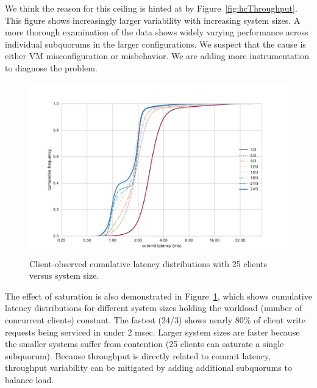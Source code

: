\documentclass[letterpaper,10pt,twocolumn]{article}
\newcommand{\sub}{subquorum\xspace}
\newcommand{\subs}{subquorums\xspace}
\begin{document}
We think the reason for this ceiling is hinted at by
Figure~\ref{fig:hcThroughput}.
This figure shows increasingly larger variability with increasing system
sizes.
A more thorough examination of the data shows widely varying performance
across individual \subs in the larger configurations.
We suspect that the cause is either VM misconfiguration or misbehavior.
We are adding more instrumentation to diagnose the problem.

\begin{figure}[t]
  \centering
  \includegraphics[width=.48\textwidth]{figures/ec2_latency_cumfreq.pdf}
  \caption{Client-observed cumulative latency distributions with 25 clients versus system size.}
  \label{fig:latency}
\end{figure}

The effect of saturation is also demonstrated in Figure~\ref{fig:latency},
which shows cumulative latency distributions for different
system sizes holding the  workload (number of concurrent clients) constant.
The fastest (24/3) shows nearly 80\% of client write requests
being serviced in under 2 msec.
Larger system sizes are faster because the smaller systems suffer from
contention (25 clients can saturate a single \sub).
Because throughput is directly related to commit latency, throughput
variability can be mitigated by adding additional subquorums to balance
load.
\end{document}
